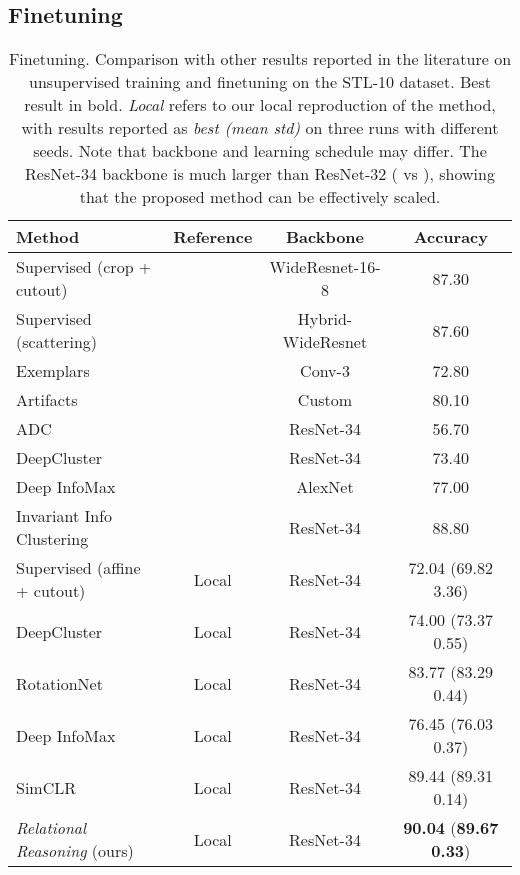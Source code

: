 \documentclass{article}
\begin{document}
\subsection{Finetuning}\label{appendix:additional_finetuning}

\begin{table}[H]
 \caption{Finetuning. Comparison with other results reported in the literature on unsupervised training and finetuning on the STL-10 dataset. Best result in bold. \emph{Local} refers to our local reproduction of the method, with results reported as \emph{best (mean  std)} on three runs with different seeds. Note that backbone and learning schedule may differ. The ResNet-34 backbone is much larger than ResNet-32 ( vs ), showing that the proposed method can be effectively scaled.}
 \label{tab:additional_finetuning}
 \begin{adjustbox}{width=1.0\columnwidth,center}
  \centering
  \begin{tabular}{lccc}
    \toprule
    \cmidrule[0.1pt](r){1-4}
    \textbf{Method} & \textbf{Reference} &
    \textbf{Backbone} & \textbf{Accuracy} \\
    \midrule
    Supervised (crop + cutout) & \cite{devries2017improved} &
    WideResnet-16-8  & 87.30\\
    Supervised (scattering) & \cite{oyallon2017scaling} &
    Hybrid-WideResnet  & 87.60\\
    Exemplars \citep{dosovitskiy2014discriminative} & \cite{dosovitskiy2014discriminative} & Conv-3 & 72.80\\
    Artifacts \citep{jenni2018self} & \cite{jenni2018self} & Custom & 80.10\\
    ADC \citep{haeusser2018associative} & \cite{ji2019invariant} & ResNet-34 & 56.70 \\
    DeepCluster \citep{caron2018deep} & \cite{ji2019invariant} &
    ResNet-34  & 73.40\\
    Deep InfoMax \citep{hjelm2018learning} & \cite{ji2019invariant} &
    AlexNet  & 77.00\\
    Invariant Info Clustering \citep{ji2019invariant} & \cite{ji2019invariant} & ResNet-34 & 88.80\\
Supervised (affine + cutout) & Local &
    ResNet-34  & 72.04 (69.82  \small{3.36})\\
    DeepCluster \citep{caron2018deep} & Local &
    ResNet-34  & 74.00 (73.37  \small{0.55})\\
    RotationNet \citep{gidaris2018unsupervised} & Local &
    ResNet-34  & 83.77 (83.29  \small{0.44})\\
    Deep InfoMax \citep{hjelm2018learning} & Local &
    ResNet-34  & 76.45 (76.03  \small{0.37})\\
    SimCLR \citep{chen2020simple} & Local &
    ResNet-34  & 89.44 (89.31  \small{0.14})\\    
    \emph{Relational Reasoning} (ours) & Local &
    ResNet-34  & \textbf{90.04} (\textbf{89.67  \small{0.33}})\\
    \bottomrule
  \end{tabular}
 \end{adjustbox}
\end{table}
\end{document}
